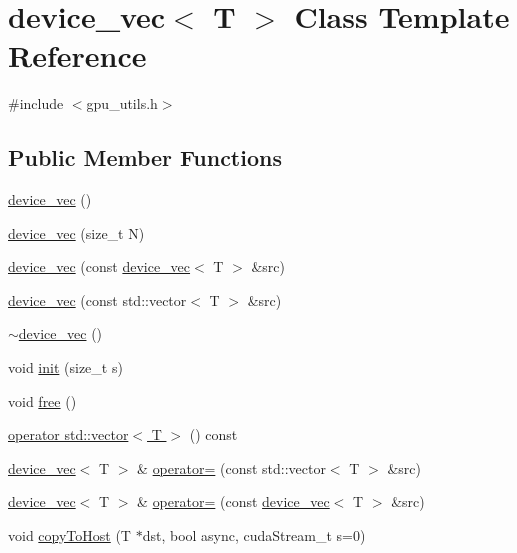 \hypertarget{classdevice__vec}{}\section{device\+\_\+vec$<$ T $>$ Class Template Reference}
\label{classdevice__vec}


{\ttfamily \#include $<$gpu\+\_\+utils.\+h$>$}

\subsection*{Public Member Functions}
\begin{DoxyCompactItemize}
\item 
\hyperlink{classdevice__vec_a5a35735d73712612a808a14be715b0d8}{device\+\_\+vec} ()
\item 
\hyperlink{classdevice__vec_ae849d2c03629659600de03d5f1e380df}{device\+\_\+vec} (size\+\_\+t N)
\item 
\hyperlink{classdevice__vec_a610a2ac053f01179ad1087f63ca48155}{device\+\_\+vec} (const \hyperlink{classdevice__vec}{device\+\_\+vec}$<$ T $>$ \&src)
\item 
\hyperlink{classdevice__vec_abb16a39b663bec4c218ae65a54e34b11}{device\+\_\+vec} (const std\+::vector$<$ T $>$ \&src)
\item 
\hyperlink{classdevice__vec_a2e2e639f54add3bf887fd2e8ba58d6ea}{$\sim$device\+\_\+vec} ()
\item 
void \hyperlink{classdevice__vec_af37488e2aa53aedb69505c2ce3602f96}{init} (size\+\_\+t s)
\item 
void \hyperlink{classdevice__vec_a4774d74dc6725dfd943e847a8fd0b14f}{free} ()
\item 
\hyperlink{classdevice__vec_a154eb7a6ed0f8210579dc470698653a3}{operator std\+::vector$<$ T $>$} () const 
\item 
\hyperlink{classdevice__vec}{device\+\_\+vec}$<$ T $>$ \& \hyperlink{classdevice__vec_a3f2ed4d208a916b85280bbe50aebb1e0}{operator=} (const std\+::vector$<$ T $>$ \&src)
\item 
\hyperlink{classdevice__vec}{device\+\_\+vec}$<$ T $>$ \& \hyperlink{classdevice__vec_a5c89e02994d71d7b02f92c97e495a260}{operator=} (const \hyperlink{classdevice__vec}{device\+\_\+vec}$<$ T $>$ \&src)
\item 
void \hyperlink{classdevice__vec_a9e8112582faa85f58fff7aeeafb3c455}{copy\+To\+Host} (T $\ast$dst, bool async, cuda\+Stream\+\_\+t s=0)
\item 

\end{DoxyCompactItemize}
